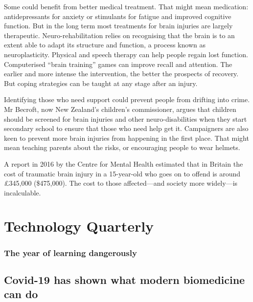 \documentclass{article}
\begin{document}
Some could benefit from better medical treatment. That might mean medication: antidepressants for anxiety or stimulants for fatigue and improved cognitive function. But in the long term most treatments for brain injuries are largely therapeutic. Neuro-rehabilitation relies on recognising that the brain is to an extent able to adapt its structure and function, a process known as neuroplasticity. Physical and speech therapy can help people regain lost function. Computerised ``brain training'' games can improve recall and attention. The earlier and more intense the intervention, the better the prospects of recovery. But coping strategies can be taught at any stage after an injury. 

Identifying those who need support could prevent people from drifting into crime. Mr Becroft, now New Zealand's children's commissioner, argues that children should be screened for brain injuries and other neuro-disabilities when they start secondary school to ensure that those who need help get it. Campaigners are also keen to prevent more brain injuries from happening in the first place. That might mean teaching parents about the risks, or encouraging people to wear helmets. 

A report in 2016 by the Centre for Mental Health estimated that in Britain the cost of traumatic brain injury in a 15-year-old who goes on to offend is around £345,000 (\$475,000). The cost to those affected---and society more widely---is incalculable. {} 
\clearpage
\section{Technology Quarterly }
\subsubsection{The year of learning dangerously }
\subsection{Covid-19 has shown what modern biomedicine can do }
\end{document}
